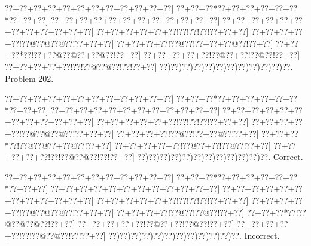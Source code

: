 \documentclass[a5paper]{article}
\begin{document}
\begin{center}
{\goo
\0??+\0??+\0??+\0??+\0??+\0??+\0??+\0??+\0??+\0??+\0??+\0??]
\0??+\0??+\0??*\0??+\0??+\0??+\0??+\0??+\0??*\0??+\0??+\0??]
\0??+\0??+\0??+\0??+\0??+\0??+\0??+\0??+\0??+\0??+\0??+\0??]
\0??+\0??+\0??+\0??+\0??+\0??+\0??+\0??+\0??+\0??+\0??+\0??]
\0??+\0??+\0??+\0??+\0??+\0??!\0??!\0??!\0??!\0??+\0??+\0??]
\0??+\0??+\0??+\0??+\0??!\0??@\0??@\0??@\0??!\0??+\0??+\0??]
\0??+\0??+\0??+\0??!\0??@\0??!\0??+\0??+\0??@\0??!\0??+\0??]
\0??+\0??+\0??*\0??!\0??+\0??@\0??@\0??+\0??@\0??!\0??+\0??]
\0??+\0??+\0??+\0??+\0??!\0??@\0??+\0??!\0??@\0??!\0??+\0??]
\0??+\0??+\0??+\0??+\0??!\0??!\0??@\0??@\0??!\0??!\0??+\0??]
\0??)\0??)\0??)\0??)\0??)\0??)\0??)\0??)\0??)\0??)\0??)\0??.
}
Problem 202.

\end{center}
\begin{center}
{\goo
\0??+\0??+\0??+\0??+\0??+\0??+\0??+\0??+\0??+\0??+\0??+\0??]
\0??+\0??+\0??*\0??+\0??+\0??+\0??+\0??+\0??*\0??+\0??+\0??]
\0??+\0??+\0??+\0??+\0??+\0??+\0??+\0??+\0??+\0??+\0??+\0??]
\0??+\0??+\0??+\0??+\0??+\0??+\0??+\0??+\0??+\0??+\0??+\0??]
\0??+\0??+\0??+\0??+\0??+\0??!\0??!\0??!\0??!\0??+\0??+\0??]
\0??+\0??+\0??+\0??+\0??!\0??@\0??@\0??@\0??!\0??+\0??+\0??]
\0??+\0??+\0??+\0??!\0??@\0??!\0??+\0??@\0??!\0??+\0??]
\0??+\0??+\0??*\0??!\0??@\0??@\0??+\0??@\0??!\0??+\0??]
\0??+\0??+\0??+\0??+\0??!\0??@\0??+\0??!\0??@\0??!\0??+\0??]
\0??+\0??+\0??+\0??+\0??!\0??!\0??@\0??@\0??!\0??!\0??+\0??]
\0??)\0??)\0??)\0??)\0??)\0??)\0??)\0??)\0??)\0??)\0??)\0??.
}
Correct. 

\end{center}
\begin{center}
{\goo
\0??+\0??+\0??+\0??+\0??+\0??+\0??+\0??+\0??+\0??+\0??+\0??]
\0??+\0??+\0??*\0??+\0??+\0??+\0??+\0??+\0??*\0??+\0??+\0??]
\0??+\0??+\0??+\0??+\0??+\0??+\0??+\0??+\0??+\0??+\0??+\0??]
\0??+\0??+\0??+\0??+\0??+\0??+\0??+\0??+\0??+\0??+\0??+\0??]
\0??+\0??+\0??+\0??+\0??+\0??!\0??!\0??!\0??!\0??+\0??+\0??]
\0??+\0??+\0??+\0??+\0??!\0??@\0??@\0??@\0??!\0??+\0??+\0??]
\0??+\0??+\0??+\0??!\0??@\0??!\0??@\0??!\0??+\0??]
\0??+\0??+\0??*\0??!\0??@\0??@\0??@\0??!\0??+\0??]
\0??+\0??+\0??+\0??+\0??!\0??@\0??+\0??!\0??@\0??!\0??+\0??]
\0??+\0??+\0??+\0??+\0??!\0??!\0??@\0??@\0??!\0??!\0??+\0??]
\0??)\0??)\0??)\0??)\0??)\0??)\0??)\0??)\0??)\0??)\0??)\0??.
}
Incorrect. 

\end{center}
\newpage
\end{document}
